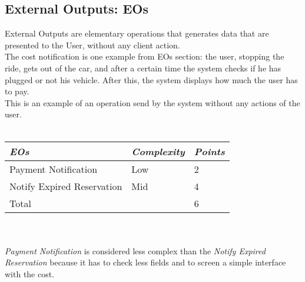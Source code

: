 \documentclass[11pt,a4paper]{report}
\begin{document}
\subsection{External Outputs: EOs}
External Outputs are elementary operations that generates data that are presented to the User, without any client action.\\
The cost notification is one example from EOs section: the user, stopping the ride, gets out of the car, and after a certain time the system checks if he has plugged or not his vehicle. After this, the system displays how much the user has to pay.\\ This is an example of an operation send by the system without any actions of the user.
\\\\
\begin{tabularx}{\textwidth}{|X|X|X|}
	\hline
	\textit{EOs} & \textit{Complexity} & \textit{Points}\\
	\hline
	Payment Notification & Low & 2\\
	Notify Expired Reservation & Mid & 4\\
	\hline
	\hline
	Total & \multicolumn{1}{X}{} & \multicolumn{1}{X|}{6}\\
	\hline
\end{tabularx}
\\\\
\textit{Payment Notification} is considered less complex than the \textit{Notify Expired Reservation} because it has to check less fields and to screen a simple interface with the cost.
\end{document}
